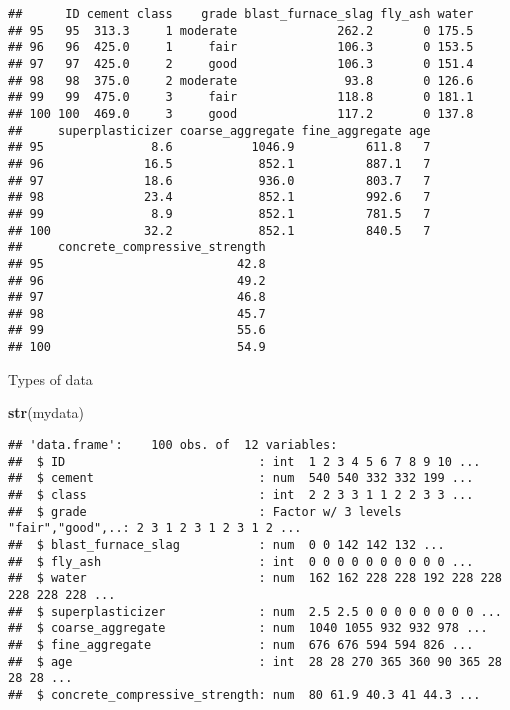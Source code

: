 \documentclass[]{article}
\newenvironment{Shaded}{\begin{snugshade}}{\end{snugshade}}
\newcommand{\KeywordTok}[1]{\textcolor[rgb]{0.13,0.29,0.53}{\textbf{#1}}}
\newcommand{\NormalTok}[1]{#1}
\begin{document}
\begin{verbatim}
##      ID cement class    grade blast_furnace_slag fly_ash water
## 95   95  313.3     1 moderate              262.2       0 175.5
## 96   96  425.0     1     fair              106.3       0 153.5
## 97   97  425.0     2     good              106.3       0 151.4
## 98   98  375.0     2 moderate               93.8       0 126.6
## 99   99  475.0     3     fair              118.8       0 181.1
## 100 100  469.0     3     good              117.2       0 137.8
##     superplasticizer coarse_aggregate fine_aggregate age
## 95               8.6           1046.9          611.8   7
## 96              16.5            852.1          887.1   7
## 97              18.6            936.0          803.7   7
## 98              23.4            852.1          992.6   7
## 99               8.9            852.1          781.5   7
## 100             32.2            852.1          840.5   7
##     concrete_compressive_strength
## 95                           42.8
## 96                           49.2
## 97                           46.8
## 98                           45.7
## 99                           55.6
## 100                          54.9
\end{verbatim}

Types of data

\begin{Shaded}
\begin{Highlighting}[]
\KeywordTok{str}\NormalTok{(mydata)}
\end{Highlighting}
\end{Shaded}

\begin{verbatim}
## 'data.frame':    100 obs. of  12 variables:
##  $ ID                           : int  1 2 3 4 5 6 7 8 9 10 ...
##  $ cement                       : num  540 540 332 332 199 ...
##  $ class                        : int  2 2 3 3 1 1 2 2 3 3 ...
##  $ grade                        : Factor w/ 3 levels "fair","good",..: 2 3 1 2 3 1 2 3 1 2 ...
##  $ blast_furnace_slag           : num  0 0 142 142 132 ...
##  $ fly_ash                      : int  0 0 0 0 0 0 0 0 0 0 ...
##  $ water                        : num  162 162 228 228 192 228 228 228 228 228 ...
##  $ superplasticizer             : num  2.5 2.5 0 0 0 0 0 0 0 0 ...
##  $ coarse_aggregate             : num  1040 1055 932 932 978 ...
##  $ fine_aggregate               : num  676 676 594 594 826 ...
##  $ age                          : int  28 28 270 365 360 90 365 28 28 28 ...
##  $ concrete_compressive_strength: num  80 61.9 40.3 41 44.3 ...
\end{verbatim}
\end{document}
